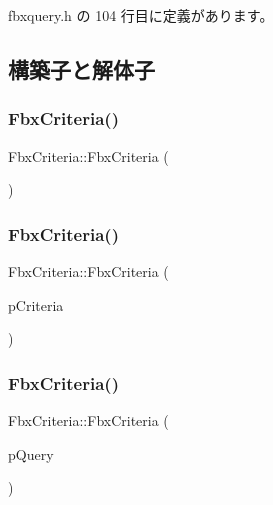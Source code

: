  fbxquery.\+h の 104 行目に定義があります。



\subsection{構築子と解体子}
\mbox{\label{class_fbx_criteria_a6fad9ae6073408c66b145a5fe0bb000f}} 
\subsubsection{\texorpdfstring{Fbx\+Criteria()}{FbxCriteria()}\hspace{0.1cm}{\footnotesize\ttfamily [1/3]}}
{\footnotesize\ttfamily Fbx\+Criteria\+::\+Fbx\+Criteria (\begin{DoxyParamCaption}{ }\end{DoxyParamCaption})}

\mbox{\label{class_fbx_criteria_afa1c0c24262d51ccda5bb559afa4ac33}} 
\subsubsection{\texorpdfstring{Fbx\+Criteria()}{FbxCriteria()}\hspace{0.1cm}{\footnotesize\ttfamily [2/3]}}
{\footnotesize\ttfamily Fbx\+Criteria\+::\+Fbx\+Criteria (\begin{DoxyParamCaption}\item[{const \hyperlink{class_fbx_criteria}{Fbx\+Criteria} \&}]{p\+Criteria }\end{DoxyParamCaption})}

\mbox{\label{class_fbx_criteria_ad30265af41804a2e45d2705a837e226c}} 
\subsubsection{\texorpdfstring{Fbx\+Criteria()}{FbxCriteria()}\hspace{0.1cm}{\footnotesize\ttfamily [3/3]}}
{\footnotesize\ttfamily Fbx\+Criteria\+::\+Fbx\+Criteria (\begin{DoxyParamCaption}\item[{\hyperlink{class_fbx_query}{Fbx\+Query} $\ast$}]{p\+Query }\end{DoxyParamCaption})}

